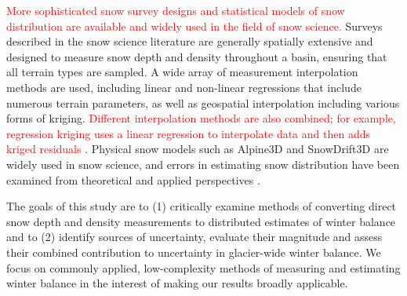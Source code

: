 \documentclass[twocolumn, letterpaper]{igs}
\begin{document}
\textcolor{red}{More sophisticated snow survey designs and statistical models of snow distribution are available and widely used in the field of snow science.} Surveys described in the snow science literature are generally spatially extensive and designed to measure snow depth and density throughout a basin, ensuring that all terrain types are sampled. A wide array of measurement interpolation methods are used, including linear \citep[e.g.][]{Lopez2010} and non-linear regressions \citep[e.g.][]{Molotch2005} that include numerous terrain parameters, as well as geospatial interpolation \citep[e.g.][]{Erxleben2002} including various forms of  kriging. \textcolor{red}{Different interpolation methods are also combined; for example, regression kriging uses a linear regression to interpolate data and then adds kriged residuals} \citep[e.g.][]{Balk2000}. Physical snow models such as Alpine3D \citep{Lehning2006} and SnowDrift3D \citep{Schneiderbauer2011} are widely used in snow science, and errors in estimating snow distribution have been examined from theoretical \citep[e.g.][]{Trujillo2015} and applied perspectives \citep[e.g.][]{Turcan1975,Woo1978, Deems2006}. 

The goals of this study are to (1) critically examine methods of converting direct snow depth and density measurements to distributed estimates of winter balance and to (2) identify sources of uncertainty, evaluate their magnitude and assess their combined contribution to uncertainty in glacier-wide winter balance. We focus on commonly applied, low-complexity methods of measuring and estimating winter balance in the interest of making our results broadly applicable.
\end{document}
